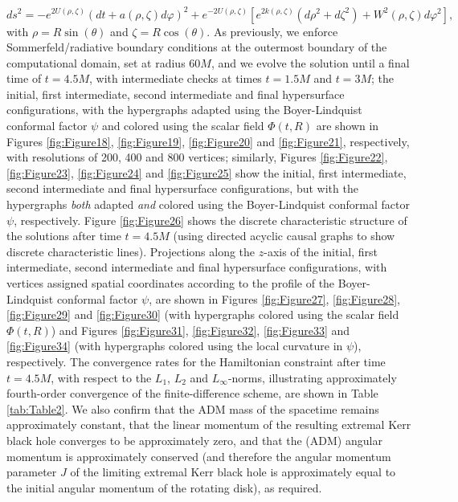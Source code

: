 \documentclass{article}
\begin{document}
\begin{equation}
d s^2 = - e^{2 U \left( \rho, \zeta \right)} \left( d t + a \left( \rho, \zeta \right) d \varphi \right)^2 + e^{-2 U \left( \rho, \zeta \right)} \left[ e^{2 k \left( \rho, \zeta \right)} \left( d \rho^2 + d \zeta^2 \right) + W^2 \left( \rho, \zeta \right) d \varphi^2 \right],
\end{equation}
with ${\rho = R \sin \left( \theta \right)}$ and ${\zeta = R \cos \left( \theta \right)}$. As previously, we enforce Sommerfeld/radiative boundary conditions at the outermost boundary of the computational domain, set at radius ${60 M}$, and we evolve the solution until a final time of ${t = 4.5 M}$, with intermediate checks at times ${t = 1.5 M}$ and ${t = 3 M}$; the initial, first intermediate, second intermediate and final hypersurface configurations, with the hypergraphs adapted using the Boyer-Lindquist conformal factor ${\psi}$ and colored using the scalar field ${\Phi \left( t, R \right)}$ are shown in Figures \ref{fig:Figure18}, \ref{fig:Figure19}, \ref{fig:Figure20} and \ref{fig:Figure21}, respectively, with resolutions of 200, 400 and 800 vertices; similarly, Figures \ref{fig:Figure22}, \ref{fig:Figure23}, \ref{fig:Figure24} and \ref{fig:Figure25} show the initial, first intermediate, second intermediate and final hypersurface configurations, but with the hypergraphs \textit{both} adapted \textit{and} colored using the Boyer-Lindquist conformal factor ${\psi}$, respectively. Figure \ref{fig:Figure26} shows the discrete characteristic structure of the solutions after time ${t = 4.5 M}$ (using directed acyclic causal graphs to show discrete characteristic lines). Projections along the $z$-axis of the initial, first intermediate, second intermediate and final hypersurface configurations, with vertices assigned spatial coordinates according to the profile of the Boyer-Lindquist conformal factor ${\psi}$, are shown in Figures \ref{fig:Figure27}, \ref{fig:Figure28}, \ref{fig:Figure29} and \ref{fig:Figure30} (with hypergraphs colored using the scalar field ${\Phi \left( t, R \right)}$) and Figures \ref{fig:Figure31}, \ref{fig:Figure32}, \ref{fig:Figure33} and \ref{fig:Figure34} (with hypergraphs colored using the local curvature in ${\psi}$), respectively. The convergence rates for the Hamiltonian constraint after time ${t = 4.5 M}$, with respect to the ${L_1}$, ${L_2}$ and ${L_{\infty}}$-norms, illustrating approximately fourth-order convergence of the finite-difference scheme, are shown in Table \ref{tab:Table2}. We also confirm that the ADM mass of the spacetime remains approximately constant, that the linear momentum of the resulting extremal Kerr black hole converges to be approximately zero, and that the (ADM) angular momentum is approximately conserved (and therefore the angular momentum parameter $J$ of the limiting extremal Kerr black hole is approximately equal to the initial angular momentum of the rotating disk), as required.
\end{document}
